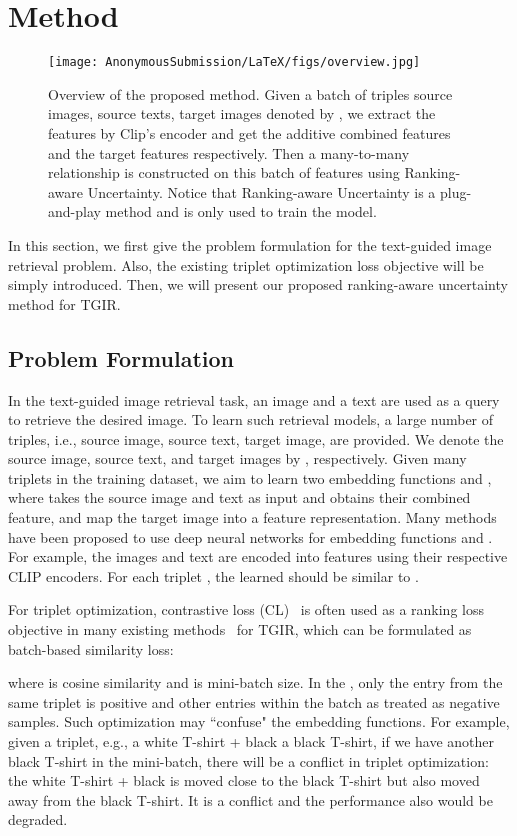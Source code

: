 \documentclass[letterpaper]{article} \usepackage{aaai24}  \usepackage{times}  \usepackage{helvet}  \usepackage{courier}  \usepackage[hyphens]{url}  \usepackage{graphicx} \urlstyle{rm} \def\UrlFont{\rm}  \usepackage{natbib}  \usepackage{caption} \frenchspacing  \setlength{\pdfpagewidth}{8.5in} \setlength{\pdfpageheight}{11in} \usepackage{amsmath,amsfonts}
\begin{document}
\section{Method}

\begin{figure*}
    \centering
    \texttt{[image: AnonymousSubmission/LaTeX/figs/overview.jpg]}
    \caption{Overview of the proposed method. Given a batch of triples source images, source texts, target images denoted by , we extract the features by Clip's encoder and get the additive combined features  and the target features  respectively. Then a many-to-many relationship is constructed on this batch of features using Ranking-aware Uncertainty. Notice that Ranking-aware Uncertainty is a plug-and-play method and is only used to train the model.}
    \label{fig:overview}
\end{figure*}

In this section, we first give the problem formulation for the text-guided image retrieval problem.  Also, the existing triplet optimization loss objective will be simply introduced. Then, we will present our proposed ranking-aware uncertainty method for TGIR. 

\subsection{Problem Formulation}
In the text-guided image retrieval task, an image and a text are used as a query to retrieve the desired image. To learn such retrieval models, a large number of triples, i.e., source image, source text, target image, are provided. We denote the source image, source text, and target images by , respectively. Given many triplets in the training dataset, we aim to learn two embedding functions  and , where  takes the source image and text as input and obtains their combined feature, and  map the target image into a feature representation. Many methods have been proposed to use deep neural networks for embedding functions  and . For example, the images and text are encoded into features using their respective CLIP encoders. For each triplet  , the learned  should be similar to .

For triplet optimization, contrastive loss (CL)~\cite{chen2020simcl} is often used as a ranking loss objective in many existing methods~\cite{TIRG, 2021CoSMo, CLIP4Cir} for TGIR, which can be formulated as batch-based similarity loss:

where  is cosine similarity and  is mini-batch size. In the , only the entry from the same triplet is positive and other entries within the batch as treated as negative samples. Such optimization may ``confuse" the  embedding functions. For example, given a triplet, e.g., a white T-shirt + black  a black T-shirt, if we have another black T-shirt in the mini-batch, there will be a conflict in triplet optimization: the white T-shirt + black is moved close to the black T-shirt but also moved away from the black T-shirt. It is a conflict and the performance also would be degraded. 
\end{document}
